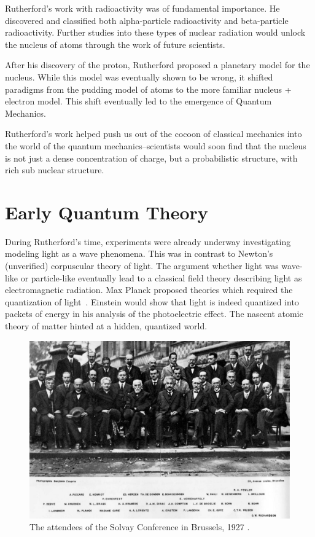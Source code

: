 Rutherford's work with radioactivity was of fundamental importance. He
discovered and classified both alpha-particle radioactivity and beta-particle
radioactivity. Further studies into these types of nuclear radiation would
unlock the nucleus of atoms through the work of future scientists.

After his discovery of the proton, Rutherford proposed a planetary model for the
nucleus. While this model was eventually shown to be wrong, it shifted paradigms
from the pudding model of atoms to the more familiar nucleus + electron model.
This shift eventually led to the emergence of Quantum Mechanics.

Rutherford's work helped push us out of the cocoon of classical mechanics into
the world of the quantum mechanics--scientists would soon find that the nucleus
is not just a dense concentration of charge, but a probabilistic structure, with
rich sub nuclear structure.

\clearpage
\section{Early Quantum Theory}

During Rutherford's time, experiments were already underway investigating
modeling light as a wave phenomena. This was in contrast to Newton's
(unverified) corpuscular theory of light. The argument whether light was
wave-like or particle-like eventually lead to a classical field theory
describing light as electromagnetic radiation. Max Planck proposed theories
which required the quantization of light~\cite{Planck1901}.  Einstein would show
that light is indeed quantized into packets of energy in his analysis of the
photoelectric effect. The nascent atomic theory of matter hinted at a hidden,
quantized world.

\begin{figure}
	\centering
	\includegraphics[width=\linewidth]{./figures/solvay.jpg}
	\caption{
		The attendees of the Solvay Conference in Brussels, 1927
		 \cite{BenjaminCroupie1927}.
	}
	\label{fig:solvay}
\end{figure}

